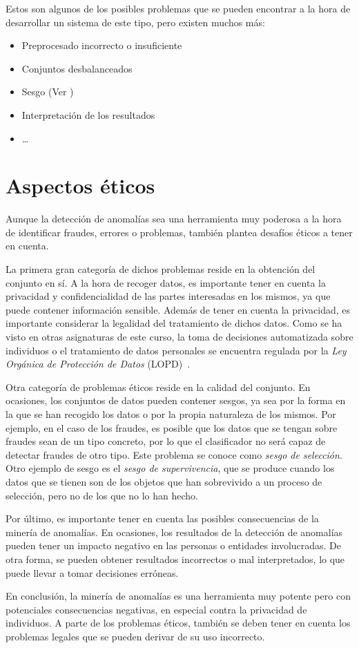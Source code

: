 \newpage{}
Estos son algunos de los posibles problemas que se pueden encontrar a la hora de desarrollar un sistema de
este tipo, pero existen muchos más:
\begin{itemize}
	\item Preprocesado incorrecto o insuficiente
	\item Conjuntos desbalanceados
	\item Sesgo (Ver )
	\item Interpretación de los resultados
	\item \ldots
\end{itemize}

\section{Aspectos éticos}\label{sec:etica}
Aunque la detección de anomalías sea una herramienta muy poderosa a la hora de identificar
fraudes, errores o problemas, también plantea desafíos éticos a tener en cuenta.

La primera gran categoría de dichos problemas reside en la obtención del conjunto en sí.
A la hora de recoger datos, es importante tener en cuenta la privacidad y confidencialidad
de las partes interesadas en los mismos, ya que puede contener información sensible. Además
de tener en cuenta la privacidad, es importante considerar la legalidad del tratamiento de
dichos datos. Como se ha visto en otras asignaturas de este curso, la toma de decisiones
automatizada sobre individuos o el tratamiento de datos personales se encuentra regulada
por la \textit{Ley Orgánica de Protección de Datos} (LOPD)~\cite{lopd}.

Otra categoría de problemas éticos reside en la calidad del conjunto. En ocasiones, los
conjuntos de datos pueden contener sesgos, ya sea por la forma en la que se han recogido
los datos o por la propia naturaleza de los mismos. Por ejemplo, en el caso de los fraudes,
es posible que los datos que se tengan sobre fraudes sean de un tipo concreto, por lo que
el clasificador no será capaz de detectar fraudes de otro tipo. Este problema se conoce
como \textit{sesgo de selección}. Otro ejemplo de sesgo es el \textit{sesgo de supervivencia},
que se produce cuando los datos que se tienen son de los objetos que han sobrevivido a un
proceso de selección, pero no de los que no lo han hecho.

Por último, es importante tener en cuenta las posibles consecuencias de la minería de
anomalías. En ocasiones, los resultados de la detección de anomalías pueden tener un
impacto negativo en las personas o entidades involucradas. De otra forma, se pueden
obtener resultados incorrectos o mal interpretados, lo que puede llevar a tomar decisiones
erróneas.

En conclusión, la minería de anomalías es una herramienta muy potente pero con potenciales
consecuencias negativas, en especial contra la privacidad de individuos. A parte de los
problemas éticos, también se deben tener en cuenta los problemas legales que se pueden
derivar de su uso incorrecto.
